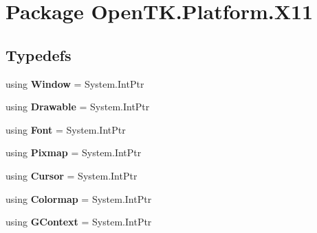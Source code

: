 \hypertarget{namespace_open_t_k_1_1_platform_1_1_x11}{\section{Package Open\-T\-K.\-Platform.\-X11}
\label{namespace_open_t_k_1_1_platform_1_1_x11}
}
\subsection*{Typedefs}
\begin{DoxyCompactItemize}
\item 
\hypertarget{namespace_open_t_k_1_1_platform_1_1_x11_adb964f8cdb1b00fd674dea2356ca0e20}{using {\bfseries Window} = System.\-Int\-Ptr}\label{namespace_open_t_k_1_1_platform_1_1_x11_adb964f8cdb1b00fd674dea2356ca0e20}

\item 
\hypertarget{namespace_open_t_k_1_1_platform_1_1_x11_ade87fadc64433aa8b06abfb6dbb14622}{using {\bfseries Drawable} = System.\-Int\-Ptr}\label{namespace_open_t_k_1_1_platform_1_1_x11_ade87fadc64433aa8b06abfb6dbb14622}

\item 
\hypertarget{namespace_open_t_k_1_1_platform_1_1_x11_a246df619beff27be95711a8865d297d9}{using {\bfseries Font} = System.\-Int\-Ptr}\label{namespace_open_t_k_1_1_platform_1_1_x11_a246df619beff27be95711a8865d297d9}

\item 
\hypertarget{namespace_open_t_k_1_1_platform_1_1_x11_a0af2a179ecf1f45f17bd697c2b0f8c8f}{using {\bfseries Pixmap} = System.\-Int\-Ptr}\label{namespace_open_t_k_1_1_platform_1_1_x11_a0af2a179ecf1f45f17bd697c2b0f8c8f}

\item 
\hypertarget{namespace_open_t_k_1_1_platform_1_1_x11_acb25c40f1775dbedb455622b7cd2151b}{using {\bfseries Cursor} = System.\-Int\-Ptr}\label{namespace_open_t_k_1_1_platform_1_1_x11_acb25c40f1775dbedb455622b7cd2151b}

\item 
\hypertarget{namespace_open_t_k_1_1_platform_1_1_x11_a7c30cca937970b295a0d02d2ce2ec05c}{using {\bfseries Colormap} = System.\-Int\-Ptr}\label{namespace_open_t_k_1_1_platform_1_1_x11_a7c30cca937970b295a0d02d2ce2ec05c}

\item 
\hypertarget{namespace_open_t_k_1_1_platform_1_1_x11_a67fe13d59d9c2c53b91d4cba0210e5ca}{using {\bfseries G\-Context} = System.\-Int\-Ptr}\label{namespace_open_t_k_1_1_platform_1_1_x11_a67fe13d59d9c2c53b91d4cba0210e5ca}


\end{DoxyCompactItemize}
